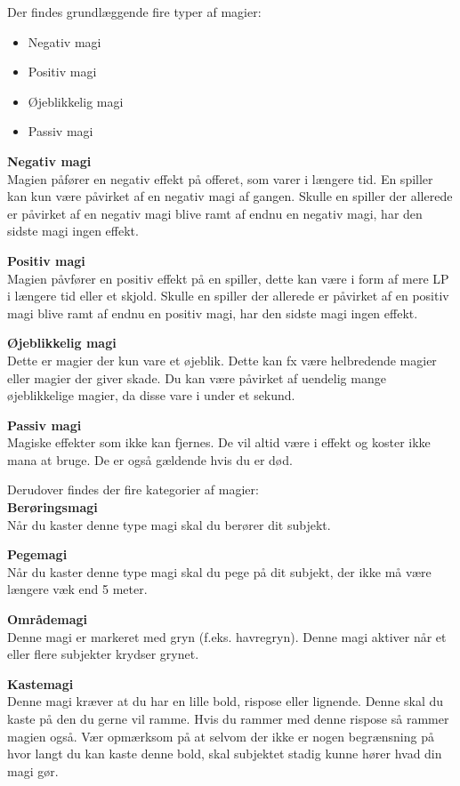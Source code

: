 Der findes grundlæggende fire typer af magier:
\begin{itemize}
    \item Negativ magi
    \item Positiv magi
    \item Øjeblikkelig magi
    \item Passiv magi
\end{itemize}

{\large\textbf{Negativ magi}}\\
Magien påfører en negativ effekt på offeret, som varer i længere tid. En spiller kan kun være påvirket af en negativ magi af gangen. Skulle en spiller der allerede er påvirket af en negativ magi blive ramt af endnu en negativ magi, har den sidste magi ingen effekt.

{\large\textbf{Positiv magi}}\\
Magien påvfører en positiv effekt på en spiller, dette kan være i form af mere LP i længere tid eller et skjold. Skulle en spiller der allerede er påvirket af en positiv magi blive ramt af endnu en positiv magi, har den sidste magi ingen effekt.

{\large\textbf{Øjeblikkelig magi}}\\
Dette er magier der kun vare et øjeblik. Dette kan fx være helbredende magier eller magier der giver skade. Du kan være påvirket af uendelig mange øjeblikkelige magier, da disse vare i under et sekund.

{\large\textbf{Passiv magi}}\\
Magiske effekter som ikke kan fjernes. De vil altid være i effekt og koster ikke mana at bruge. De er også gældende hvis du er død.

Derudover findes der fire kategorier af magier:\\
{\large\textbf{Berøringsmagi}}\\
Når du kaster denne type magi skal du berører dit subjekt.

{\large\textbf{Pegemagi}}\\
Når du kaster denne type magi skal du pege på dit subjekt, der ikke må være længere væk end 5 meter.

{\large\textbf{Områdemagi}}\\
Denne magi er markeret med gryn (f.eks. havregryn). Denne magi aktiver når et eller flere subjekter krydser grynet.

{\large\textbf{Kastemagi}}\\
Denne magi kræver at du har en lille bold, rispose eller lignende. Denne skal du kaste på den du gerne vil ramme. Hvis du rammer med denne rispose så rammer magien også. Vær opmærksom på at selvom der ikke er nogen begrænsning på hvor langt du kan kaste denne bold, skal subjektet stadig kunne hører hvad din magi gør.

